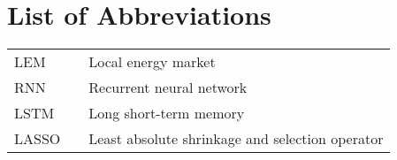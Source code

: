 \section*{List of Abbreviations}


\begin{tabular}{llp{10cm}}
    LEM     & &  Local energy market           \\
    RNN     & &  Recurrent neural network      \\
    LSTM    & &  Long short-term memory        \\
    LASSO   & &  Least absolute shrinkage and selection operator
\end{tabular}
